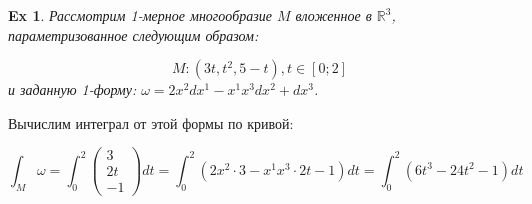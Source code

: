 \documentclass{article}
\newtheorem{example}{Ex}
\begin{document}
 	
 	
 	\begin{example}Рассмотрим 1-мерное многообразие $M$ вложенное в $\mathbb{R}^3$, параметризованное следующим образом:
 		
 		$$M : (3t, t^2, 5-t), t \in [0;2]$$
 		и заданную 1-форму: $\omega = 2x^2 dx^1 - x^1 x^3 dx^2 + dx^3$.
 	\end{example}
 	Вычислим интеграл от этой формы по кривой:
 	
 	\begin{equation*}
 	\int_M \omega = \int_0^2 \begin{pmatrix} 3 \\ 2t \\ -1 \end{pmatrix} dt = \int_0^2 (2x^2\cdot 3 - x^1 x^3\cdot 2t - 1) dt = \int_0^2(6t^3-24t^2-1)dt
 	\end{equation*}
 	
\end{document}
